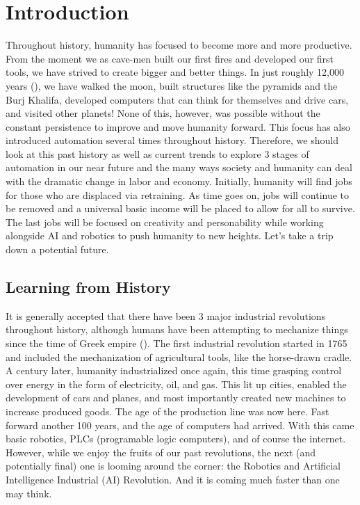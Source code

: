 \section{Introduction}

Throughout history, humanity has focused to become more and more productive. From the moment we as cave-men built our first fires and developed our first tools, we have strived to create bigger and better things. In just roughly 12,000 years (\cite{HumanHistory}), we have walked the moon, built structures like the pyramids and the Burj Khalifa, developed computers that can think for themselves and drive cars, and visited other planets! None of this, however, was possible without the constant persistence to improve and move humanity forward. This focus has also introduced automation several times throughout history. Therefore, we should look at this past history as well as current trends to explore 3 stages of automation in our near future and the many ways society and humanity can deal with the dramatic change in labor and economy. Initially, humanity will find jobs for those who are displaced via retraining. As time goes on, jobs will continue to be removed and a universal basic income will be placed to allow for all to survive. The last jobs will be focused on creativity and personability while working alongside AI and robotics to push humanity to new heights. Let's take a trip down a potential future.

\subsection{Learning from History}

It is generally accepted that there have been 3 major industrial revolutions throughout history, although humans have been attempting to mechanize things since the time of Greek empire (\cite{AutomationPeriods}). The first industrial revolution started in 1765 and included the mechanization of agricultural tools, like the horse-drawn cradle. A century later, humanity industrialized once again, this time grasping control over energy in the form of electricity, oil, and gas. This lit up cities, enabled the development of cars and planes, and most importantly created new machines to increase produced goods. The age of the production line was now here. Fast forward another 100 years, and the age of computers had arrived. With this came basic robotics, PLCs (programable logic computers), and of course the internet. However, while we enjoy the fruits of our past revolutions, the next (and potentially final) one is looming around the corner: the Robotics and Artificial Intelligence Industrial (AI) Revolution. And it is coming much faster than one may think.

